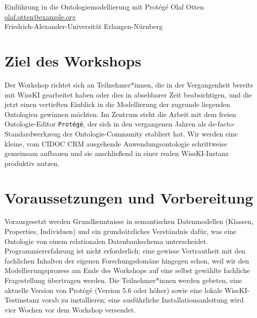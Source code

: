 \graphicspath{{abstracts/workshops/01-protege-einfuehrung/img/}{img/}}

\begin{beitrag}{Einführung in die Ontologiemodellierung mit Protégé}{%
Olaf Otten\, \\
\small \href{mailto:olaf.otten@example.org}{olaf.otten@example.org} \\
\small Friedrich-Alexander-Universität Erlangen-Nürnberg
}

\begin{abstract}
Der Workshop vermittelt WissKI-Anwender*innen mit Grundkenntnissen in semantischen Datenmodellen einen vertieften Einblick in die Ontologiemodellierung mit Protégé: In vier Modulen wird aufbauend auf CIDOC CRM eine Anwendungsontologie für historische Briefkorrespondenzen schrittweise entwickelt, in den WissKI-Pathbuilder importiert und auf eigene Forschungsfragestellungen übertragen. Ziel ist nicht allein die technische Fertigkeit, sondern die Fähigkeit, ontologische Modellierungsentscheidungen methodisch zu begründen und reversibel zu gestalten.
\end{abstract}

\section{Ziel des Workshops}
Der Workshop richtet sich an Teilnehmer*innen, die in der Vergangenheit bereits mit WissKI gearbeitet haben oder dies in absehbarer Zeit beabsichtigen, und die jetzt einen vertieften Einblick in die Modellierung der zugrunde liegenden Ontologien gewinnen möchten. Im Zentrum steht die Arbeit mit dem freien Ontologie-Editor \texttt{Protégé}, der sich in den vergangenen Jahren als de-facto-Standardwerkzeug der Ontologie-Community etabliert hat. Wir werden eine kleine, vom CIDOC CRM ausgehende Anwendungsontologie schrittweise gemeinsam aufbauen und sie anschließend in einer realen WissKI-Instanz produktiv nutzen.

\section{Voraussetzungen und Vorbereitung}
Vorausgesetzt werden Grundkenntnisse in semantischen Datenmodellen (Klassen, Properties, Individuen) und ein grundsätzliches Verständnis dafür, was eine Ontologie von einem relationalen Datenbankschema unterscheidet. Programmiererfahrung ist nicht erforderlich; eine gewisse Vertrautheit mit den fachlichen Inhalten der eigenen Forschungsdomäne hingegen schon, weil wir den Modellierungsprozess am Ende des Workshops auf eine selbst gewählte fachliche Fragestellung übertragen werden. Die Teilnehmer*innen werden gebeten, eine aktuelle Version von Protégé (Version 5.6 oder höher) sowie eine lokale WissKI-Testinstanz vorab zu installieren; eine ausführliche Installationsanleitung wird vier Wochen vor dem Workshop versendet.


\end{beitrag}
